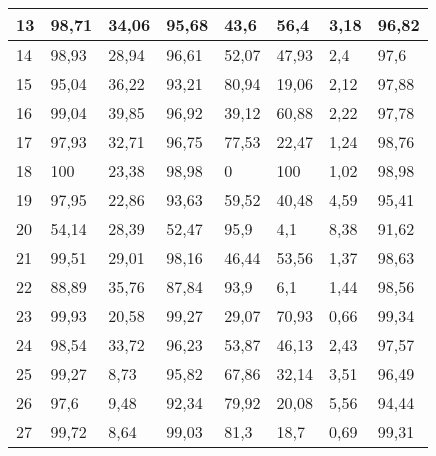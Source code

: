 \begin{longtable}[c]{|l|l|l|l|l|l|l|l|}
13              & 98,71        & 34,06        & 95,68       & 43,6          & 56,4          & 3,18          & 96,82         \\ \hline
14              & 98,93        & 28,94        & 96,61       & 52,07         & 47,93         & 2,4           & 97,6          \\ \hline
15              & 95,04        & 36,22        & 93,21       & 80,94         & 19,06         & 2,12          & 97,88         \\ \hline
16              & 99,04        & 39,85        & 96,92       & 39,12         & 60,88         & 2,22          & 97,78         \\ \hline
17              & 97,93        & 32,71        & 96,75       & 77,53         & 22,47         & 1,24          & 98,76         \\ \hline
18              & 100          & 23,38        & 98,98       & 0             & 100           & 1,02          & 98,98         \\ \hline
19              & 97,95        & 22,86        & 93,63       & 59,52         & 40,48         & 4,59          & 95,41         \\ \hline
20              & 54,14        & 28,39        & 52,47       & 95,9          & 4,1           & 8,38          & 91,62         \\ \hline
21              & 99,51        & 29,01        & 98,16       & 46,44         & 53,56         & 1,37          & 98,63         \\ \hline
22              & 88,89        & 35,76        & 87,84       & 93,9          & 6,1           & 1,44          & 98,56         \\ \hline
23              & 99,93        & 20,58        & 99,27       & 29,07         & 70,93         & 0,66          & 99,34         \\ \hline
24              & 98,54        & 33,72        & 96,23       & 53,87         & 46,13         & 2,43          & 97,57         \\ \hline
25              & 99,27        & 8,73         & 95,82       & 67,86         & 32,14         & 3,51          & 96,49         \\ \hline
26              & 97,6         & 9,48         & 92,34       & 79,92         & 20,08         & 5,56          & 94,44         \\ \hline
27              & 99,72        & 8,64         & 99,03       & 81,3          & 18,7          & 0,69          & 99,31         \\ \hline

\end{longtable}
